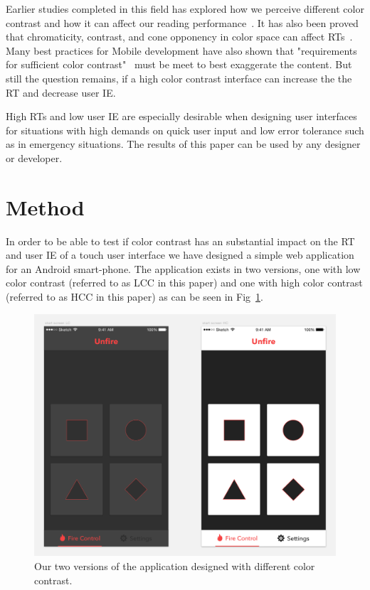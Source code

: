 \documentclass[runningheads,a4paper]{llncs}
\begin{document}
Earlier studies completed in this field has explored how we perceive different color contrast and how it can affect our reading performance~\cite{wu2003improving}. It has also been proved that chromaticity, contrast, and cone opponency in color space can affect RTs~\cite{mckeefry2003simple}. Many best practices for Mobile development have also shown that "requirements for sufficient color contrast"~\cite{marcus2013design} must be meet to best exaggerate the content. But still the question remains, if a high color contrast interface can increase the the RT and decrease user IE.

High RTs and low user IE are especially desirable when designing user interfaces for situations with high demands on quick user input and low error tolerance such as in emergency situations. The results of this paper can be used by any designer or developer.

\section{Method}
In order to be able to test if color contrast has an substantial impact on the RT and user IE of a touch user interface we have designed a simple web application for an Android smart-phone. The application exists in two versions, one with low color contrast (referred to as LCC in this paper) and one with high color contrast (referred to as HCC in this paper) as can be seen in Fig~\ref{fig:application}.

\begin{figure}
	\centering
	\includegraphics[width=\textwidth]{application}
	\caption{Our two versions of the application designed with different color contrast.
	\label{fig:application}}
\end{figure}
\end{document}
